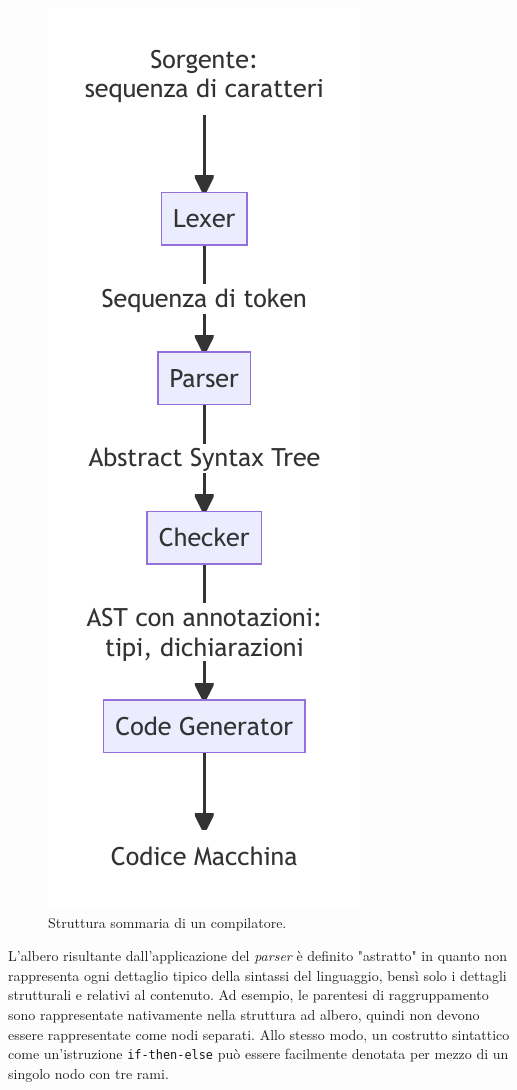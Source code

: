\begin{figure}[h]
    \centering
    \includegraphics[width=0.2\textheight]{resources/img/01-compiler-arch.pdf}
    \caption{Struttura sommaria di un compilatore.}
    \label{img:01-compiler-arch}
\end{figure}

L'albero risultante dall'applicazione del \textit{parser} è definito "astratto" in quanto non rappresenta ogni dettaglio tipico della sintassi del linguaggio, bensì solo i dettagli strutturali e relativi al contenuto.
%
Ad esempio, le parentesi di raggruppamento sono rappresentate nativamente nella struttura ad albero, quindi non devono essere rappresentate come nodi separati.
%
Allo stesso modo, un costrutto sintattico come un'istruzione \texttt{if-then-else} può essere facilmente denotata per mezzo di un singolo nodo con tre rami.

